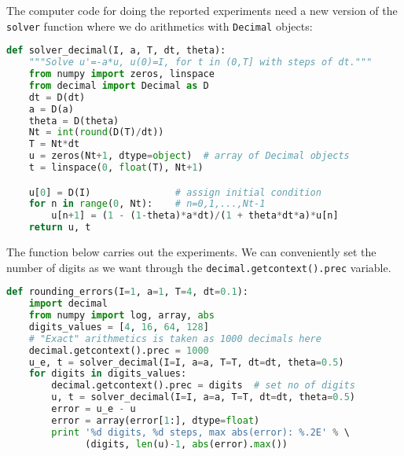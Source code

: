 \documentclass[graybox,sectrefs,envcountresetchap,open=right,final]{svmonodo}
\begin{document}
The computer code for doing the reported experiments need a new version
of the \texttt{solver} function where we do arithmetics with \texttt{Decimal}
objects:


















\begin{lstlisting}[language=python,style=blue1_bluegreen]
def solver_decimal(I, a, T, dt, theta):
    """Solve u'=-a*u, u(0)=I, for t in (0,T] with steps of dt."""
    from numpy import zeros, linspace
    from decimal import Decimal as D
    dt = D(dt)
    a = D(a)
    theta = D(theta)
    Nt = int(round(D(T)/dt))
    T = Nt*dt
    u = zeros(Nt+1, dtype=object)  # array of Decimal objects
    t = linspace(0, float(T), Nt+1)

    u[0] = D(I)               # assign initial condition
    for n in range(0, Nt):    # n=0,1,...,Nt-1
        u[n+1] = (1 - (1-theta)*a*dt)/(1 + theta*dt*a)*u[n]
    return u, t

\end{lstlisting}

The function below carries out the experiments. We can conveniently
set the number of digits as we want through the \texttt{decimal.getcontext().prec}
variable.
















\begin{lstlisting}[language=python,style=blue1_bluegreen]
def rounding_errors(I=1, a=1, T=4, dt=0.1):
    import decimal
    from numpy import log, array, abs
    digits_values = [4, 16, 64, 128]
    # "Exact" arithmetics is taken as 1000 decimals here
    decimal.getcontext().prec = 1000
    u_e, t = solver_decimal(I=I, a=a, T=T, dt=dt, theta=0.5)
    for digits in digits_values:
        decimal.getcontext().prec = digits  # set no of digits
        u, t = solver_decimal(I=I, a=a, T=T, dt=dt, theta=0.5)
        error = u_e - u
        error = array(error[1:], dtype=float)
        print '%d digits, %d steps, max abs(error): %.2E' % \ 
              (digits, len(u)-1, abs(error).max())

\end{lstlisting}
\end{document}
